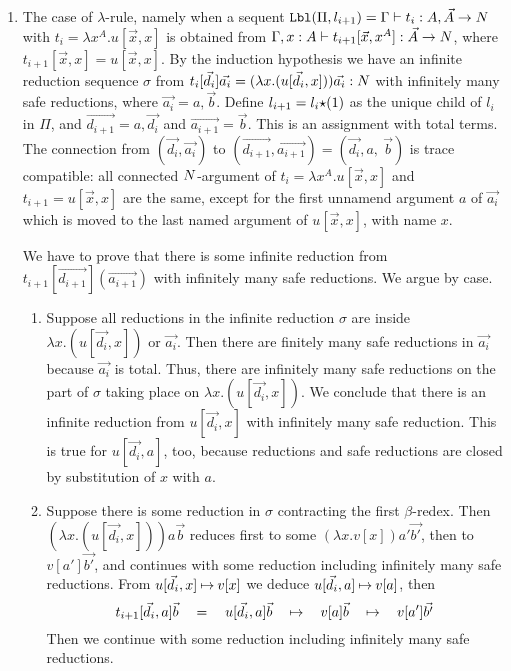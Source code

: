 \documentclass{article}
\newenvironment{proof}[1][Proof]{\begin{trivlist}
\item[\hskip \labelsep {\bfseries #1}]}{\end{trivlist}}
\begin{document}
\begin{proof}
\begin{enumerate}
\item
  The case of $\lambda$-rule, namely when a sequent
  ${\tt Lbl}(\Pi,l_{i+1}) = 
    \Gamma\vdash t_i : A, \vec{A} \rightarrow {N}$ with $t_i = \lambda x^A.u[\vec{x},x]$
  is obtained from
  $\Gamma,x:A\vdash t_{i+1}[\vec{x},x^A]:\vec{A}\rightarrow{N}$, 
  where $t_{i+1}[\vec{x},x]=u[\vec{x},x]$.
  By the induction hypothesis we have an infinite reduction sequence $\sigma$ from
  $t_i[\vec{d_i}]\vec{a_i} = (\lambda x.(u[\vec{d_i},x]))\vec{a_i}:{N}$ with infinitely many safe
  reductions,
  where $\vec{a_i} = a,\vec{b}$. 
  Define $l_{i+1}=l_i{\star}(1)$ as the unique child of $l_i$ in $\Pi$,
  and $\vec{d_{i+1}} = a,\vec{d_i}$  and $\vec{a_{i+1}} = \vec{b}$. 
  This is an assignment with total terms.
    The connection from 
  $(\vec{d_i},\vec{a_i})$ to $(\vec{d_{i+1}},\vec{a_{i+1}}) = (\vec{d_i},a, \ \vec{b})$ is
  trace compatible: all connected ${N}$-argument of 
  $t_{i}=\lambda x^A.u[\vec{x},x]$ and $t_{i+1}=u[\vec{x},x]$ are 
  the same, except for the first unnamend argument $a$ of $\vec{a_i}$ which is moved to
  the last named argument of $u[\vec{x},x]$, with name $x$.
  
  We have to prove that there is some infinite reduction from 
  $t_{i+1}[\vec{d_{i+1}}](\vec{a_{i+1}})$ with infinitely
  many safe reductions. We argue by case.

\begin{enumerate}
\item
 Suppose all reductions in the infinite reduction $\sigma$ 
  are inside $\lambda x.(u[\vec{d_i},x])$ or $\vec{a_i}$.
 Then there are finitely many safe reductions in $\vec{a_i}$ because $\vec{a_i}$ is total.
 Thus, there are infinitely many safe reductions on the part of $\sigma$
  taking place on $\lambda x.(u[\vec{d_i},x])$.
  We conclude that there is an infinite reduction from $u[\vec{d_i},x]$ with infinitely many safe reduction.
  This is true for $u[\vec{d_i},a]$, too, because reductions and safe reductions are closed by substitution
  of $x$ with $a$.

\item
 Suppose there is some reduction in $\sigma$ contracting the first $\beta$-redex.
 Then  $(\lambda x.(u[\vec{d_i},x]))a\vec{b}$ reduces first to some
 $ (\lambda x.v[x])a'\vec{b'}$, then to $v[a']\vec{b'}$, and continues with some reduction
including infinitely many safe reductions. 
From $u[\vec{d_i},x] \mathbin{\mapsto} v[x]$ we deduce $u[\vec{d_i},a] \mathbin{\mapsto} v[a]$, then
$$
        		t_{i+1}[\vec{d_i},a]\vec{b}  
\ \ \ 		=
\ \ \     u[\vec{d_i},a]\vec{b} 
\ \ \    \mathbin{\mapsto} 
\ \ \    v[a]\vec{b}
\ \ \    \mathbin{\mapsto} 
 \ \ \   v[a']\vec{b'}
$$ 
Then we continue with some reduction
including infinitely many safe reductions. 
\end{enumerate}


\end{enumerate}
\end{proof}
\end{document}

